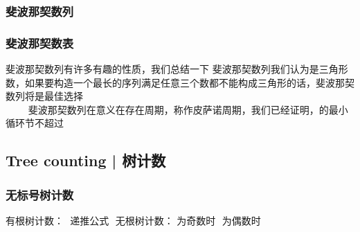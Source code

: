 \documentclass[8pt,a4paper]{article}
\newcommand{\code}[1]{
    
}
\newcommand{\txt}[1]{\par\noindent\footnotesize #1}
\newcommand{\inlineformula}[1]{\ensuremath{}}
\newcommand{\displayformula}[1]{%
    \vspace{0.2em}
    \[
        
    \]
}
\begin{document}
\begin{multicols}{2}
        \subsubsection{斐波那契数列}
        \subsubsection{斐波那契数表}
            \txt{斐波那契数列有许多有趣的性质，我们总结一下
\inlineformula{./assets/formulas_tex/formula_292.tex}斐波那契数列我们认为是三角形数，如果要构造一个最长的序列满足任意三个数都不能构成三角形的话，斐波那契数列将是最佳选择
\inlineformula{./assets/formulas_tex/formula_293.tex}\inlineformula{./assets/formulas_tex/formula_294.tex}
\inlineformula{./assets/formulas_tex/formula_295.tex}\inlineformula{./assets/formulas_tex/formula_296.tex}
\inlineformula{./assets/formulas_tex/formula_297.tex}\displayformula{./assets/formulas_tex/formula_298.tex} \inlineformula{./assets/formulas_tex/formula_299.tex}
\inlineformula{./assets/formulas_tex/formula_300.tex}\inlineformula{./assets/formulas_tex/formula_301.tex}
\inlineformula{./assets/formulas_tex/formula_302.tex}\inlineformula{./assets/formulas_tex/formula_303.tex}
\inlineformula{./assets/formulas_tex/formula_304.tex}\inlineformula{./assets/formulas_tex/formula_305.tex}
\inlineformula{./assets/formulas_tex/formula_306.tex}\inlineformula{./assets/formulas_tex/formula_307.tex}
\inlineformula{./assets/formulas_tex/formula_308.tex}\inlineformula{./assets/formulas_tex/formula_309.tex}
\inlineformula{./assets/formulas_tex/formula_310.tex}\inlineformula{./assets/formulas_tex/formula_311.tex}
\inlineformula{./assets/formulas_tex/formula_312.tex}斐波那契数列在\inlineformula{./assets/formulas_tex/formula_313.tex}意义在存在周期，称作皮萨诺周期，我们已经证明，\inlineformula{./assets/formulas_tex/formula_314.tex}\inlineformula{./assets/formulas_tex/formula_315.tex}的最小循环节不超过\inlineformula{./assets/formulas_tex/formula_316.tex}}
            \code{src/number_theory/几个经典计数模型_2_5.cpp}

    \subsection{Tree counting | 树计数}
        \subsubsection{无标号树计数}
            \txt{有根树计数：
\inlineformula{./assets/formulas_tex/formula_317.tex}
递推公式
\inlineformula{./assets/formulas_tex/formula_318.tex}
无根树计数：
\inlineformula{./assets/formulas_tex/formula_319.tex}为奇数时
\inlineformula{./assets/formulas_tex/formula_320.tex}
\inlineformula{./assets/formulas_tex/formula_321.tex}为偶数时
\inlineformula{./assets/formulas_tex/formula_322.tex}}

\end{multicols}
\end{document}
